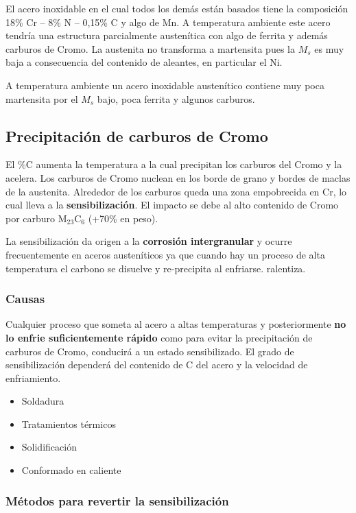 El acero inoxidable en el cual todos los demás están basados tiene la composición 18\% Cr -- 8\% N -- 0,15\% C y algo de Mn. A temperatura ambiente este acero tendría una estructura parcialmente austenítica con algo de ferrita y además carburos de Cromo. La austenita no transforma a martensita pues la $M_s$ es muy baja a consecuencia del contenido de aleantes, en particular el Ni.

A temperatura ambiente un acero inoxidable austenítico contiene muy poca martensita por el $M_s$ bajo, poca ferrita y algunos carburos.

\subsection{Precipitación de carburos de Cromo}
\label{ssec:sensibilizacion}
El \%C aumenta la temperatura a la cual precipitan los carburos del Cromo y la acelera. Los carburos de Cromo nuclean en los borde de grano y bordes de maclas de la austenita. Alrededor de los carburos queda una zona empobrecida en Cr, lo cual lleva a la \textbf{sensibilización}. El impacto se debe al alto contenido de Cromo por carburo M$_{23}$C$_6$ (+70\% en peso).

La sensibilización da origen a la \textbf{corrosión intergranular} y ocurre frecuentemente en aceros austeníticos ya que cuando hay un proceso de alta temperatura el carbono se disuelve y re-precipita al enfriarse.
ralentiza. 

\subsubsection{Causas}
Cualquier proceso que someta al acero a altas temperaturas y posteriormente \textbf{no lo enfrie suficientemente rápido} como para evitar la precipitación de carburos de Cromo, conducirá a un estado sensibilizado. El grado de sensibilización dependerá del contenido de C del acero y la velocidad de enfriamiento.

\begin{itemize}
	\item Soldadura
	\item Tratamientos térmicos
	\item Solidificación
	\item Conformado en caliente
\end{itemize}

\subsubsection{Métodos para revertir la sensibilización}

